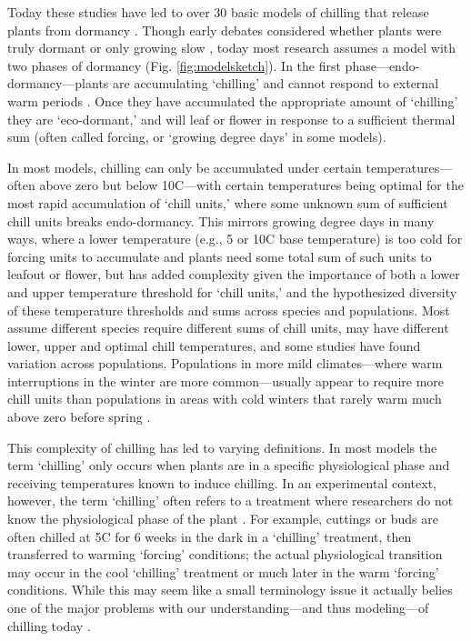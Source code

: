 \documentclass[11pt]{article}
\begin{document}
Today these studies have led to over 30 basic models of chilling that release plants from dormancy \citep[][and hundreds or more models considering variation on these models for different species and cultivars]{basler2016evaluating,hufkens2018integrated}. Though early debates considered whether plants were truly dormant or only growing slow \citep[`dormancy' or `rest' versus `quiescent;][]{considine2016language}, today most research assumes a model with two phases of dormancy (Fig. \ref{fig:modelsketch}). In the first phase---endo-dormancy---plants are accumulating `chilling' and cannot respond to external warm periods  \citep[thus the `endo' part of the term,][]{chuine2016,lundell2020}. Once they have accumulated the appropriate amount of `chilling' they are `eco-dormant,' and will leaf or flower in response to a sufficient thermal sum (often called forcing, or `growing degree days' in some models). 

In most models, chilling can only be accumulated under certain temperatures---often above zero but below 10\degree C---with certain temperatures being optimal for the most rapid accumulation of `chill units,' where some unknown sum of sufficient chill units breaks endo-dormancy. This mirrors growing degree days in many ways, where a lower temperature (e.g., 5 or 10\degree C base temperature) is too cold for forcing units to accumulate and plants need some total sum of such units to leafout or flower, but has added complexity given the importance of both a lower and upper temperature threshold for `chill units,' and the hypothesized diversity of these temperature thresholds and sums across species and populations. Most assume different species require different sums of chill units, may have different lower, upper and optimal chill temperatures, and some studies have found variation across populations. Populations in more mild climates---where warm interruptions in the winter are more common---usually appear to require more chill units than populations in areas with cold winters that rarely warm much above zero before spring \citep{campbell1979,leinonen1996dependence}. 

This complexity of chilling has led to varying definitions. In most models the term `chilling' only occurs when plants are in a specific physiological phase and receiving temperatures known to induce chilling. In an experimental context, however, the term `chilling' often refers to a treatment where researchers do not know the physiological phase of the plant \citep{flynn2018,ospreebbms}. For example, cuttings or buds are often chilled at 5\degree C for 6 weeks in the dark in a `chilling' treatment, then transferred to warming `forcing' conditions; the actual physiological transition may occur in the cool `chilling' treatment or much later in the warm `forcing' conditions. While this may seem like a small terminology issue it actually belies one of the major problems with our understanding---and thus modeling---of chilling today \citep{ospreebbms}. 
\end{document}
